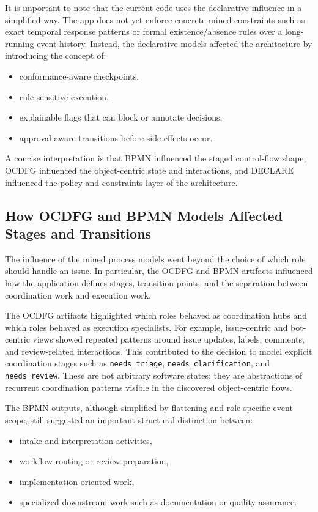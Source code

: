 \documentclass[11pt,a4paper]{article}
\begin{document}
It is important to note that the current code uses the declarative influence in a simplified way. The app does not yet enforce concrete mined constraints such as exact temporal response patterns or formal existence/absence rules over a long-running event history. Instead, the declarative models affected the architecture by introducing the concept of:
\begin{itemize}
    \item conformance-aware checkpoints,
    \item rule-sensitive execution,
    \item explainable flags that can block or annotate decisions,
    \item approval-aware transitions before side effects occur.
\end{itemize}

A concise interpretation is that BPMN influenced the staged control-flow shape, OCDFG influenced the object-centric state and interactions, and DECLARE influenced the policy-and-constraints layer of the architecture.

\subsection{How OCDFG and BPMN Models Affected Stages and Transitions}

The influence of the mined process models went beyond the choice of which role should handle an issue. In particular, the OCDFG and BPMN artifacts influenced how the application defines stages, transition points, and the separation between coordination work and execution work.

The OCDFG artifacts highlighted which roles behaved as coordination hubs and which roles behaved as execution specialists. For example, issue-centric and bot-centric views showed repeated patterns around issue updates, labels, comments, and review-related interactions. This contributed to the decision to model explicit coordination stages such as \texttt{needs\_triage}, \texttt{needs\_clarification}, and \texttt{needs\_review}. These are not arbitrary software states; they are abstractions of recurrent coordination patterns visible in the discovered object-centric flows.

The BPMN outputs, although simplified by flattening and role-specific event scope, still suggested an important structural distinction between:
\begin{itemize}
    \item intake and interpretation activities,
    \item workflow routing or review preparation,
    \item implementation-oriented work,
    \item specialized downstream work such as documentation or quality assurance.
\end{itemize}
\end{document}

